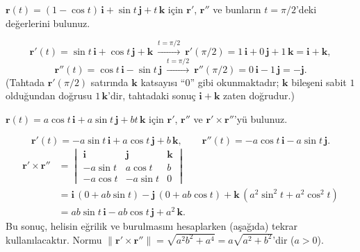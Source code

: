 \begin{soru}
$\mathbf r(t)=(1-\cos t)\,\mathbf i+\sin t\,\mathbf j+t\,\mathbf k$ için $\mathbf r'$, $\mathbf r''$ ve bunların $t=\pi/2$'deki değerlerini bulunuz.
\end{soru}
\begin{cevap}
\[ \mathbf r'(t)=\sin t\,\mathbf i+\cos t\,\mathbf j+\mathbf k\ \xrightarrow{t=\pi/2}\ \mathbf r'(\pi/2)=1\,\mathbf i+0\,\mathbf j+1\,\mathbf k=\mathbf i+\mathbf k, \]
\[ \mathbf r''(t)=\cos t\,\mathbf i-\sin t\,\mathbf j\ \xrightarrow{t=\pi/2}\ \mathbf r''(\pi/2)=0\,\mathbf i-1\,\mathbf j=-\mathbf j . \]
(Tahtada $\mathbf r'(\pi/2)$ satırında $\mathbf k$ katsayısı ``$0$'' gibi okunmaktadır; $\mathbf k$ bileşeni sabit $1$ olduğundan
doğrusu $1\,\mathbf k$'dir, tahtadaki sonuç $\mathbf i+\mathbf k$ zaten doğrudur.)
\end{cevap}

\begin{soru}
$\mathbf r(t)=a\cos t\,\mathbf i+a\sin t\,\mathbf j+bt\,\mathbf k$ için $\mathbf r'$, $\mathbf r''$ ve $\mathbf r'\times\mathbf r''$'yü bulunuz.
\end{soru}
\begin{cevap}
\[ \mathbf r'(t)=-a\sin t\,\mathbf i+a\cos t\,\mathbf j+b\,\mathbf k,\qquad \mathbf r''(t)=-a\cos t\,\mathbf i-a\sin t\,\mathbf j . \]
\begin{align*}
\mathbf r'\times\mathbf r''&=\begin{vmatrix}\mathbf i&\mathbf j&\mathbf k\\-a\sin t&a\cos t&b\\-a\cos t&-a\sin t&0\end{vmatrix}\\
&=\mathbf i\,(0+ab\sin t)-\mathbf j\,(0+ab\cos t)+\mathbf k\,(a^2\sin^2t+a^2\cos^2t)\\
&=ab\sin t\,\mathbf i-ab\cos t\,\mathbf j+a^2\,\mathbf k .
\end{align*}
Bu sonuç, helisin eğrilik ve burulmasını hesaplarken (aşağıda) tekrar kullanılacaktır. Normu
$\|\mathbf r'\times\mathbf r''\|=\sqrt{a^2b^2+a^4}=a\sqrt{a^2+b^2}$'dir ($a>0$).
\end{cevap}

